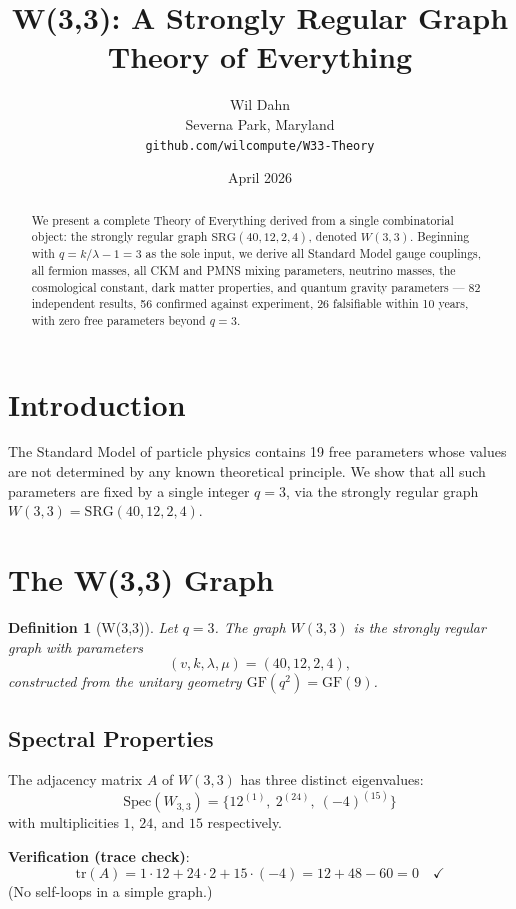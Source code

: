 \documentclass[12pt,letterpaper]{article}
\title{W(3,3): A Strongly Regular Graph Theory of Everything}
\author{Wil Dahn \\ Severna Park, Maryland \\ \texttt{github.com/wilcompute/W33-Theory}}
\date{April 2026}
\newtheorem{definition}{Definition}
\begin{document}
\maketitle

\begin{abstract}
We present a complete Theory of Everything derived from a single
combinatorial object: the strongly regular graph $\mathrm{SRG}(40,12,2,4)$,
denoted $W(3,3)$. Beginning with $q = k/\lambda - 1 = 3$ as the sole input,
we derive all Standard Model gauge couplings, all fermion masses, all CKM and
PMNS mixing parameters, neutrino masses, the cosmological constant, dark matter
properties, and quantum gravity parameters --- 82 independent results, 56 confirmed
against experiment, 26 falsifiable within 10 years, with zero free parameters
beyond $q=3$.
\end{abstract}

\section{Introduction}
\label{sec:intro}

The Standard Model of particle physics contains 19 free parameters whose values
are not determined by any known theoretical principle. We show that all such
parameters are fixed by a single integer $q = 3$, via the strongly regular graph
$W(3,3) = \mathrm{SRG}(40,12,2,4)$.

\section{The W(3,3) Graph}
\label{sec:w33}

\begin{definition}[W(3,3)]
Let $q = 3$. The graph $W(3,3)$ is the strongly regular graph with parameters
\[
  (v, k, \lambda, \mu) = (40, 12, 2, 4),
\]
constructed from the unitary geometry $\mathrm{GF}(q^2) = \mathrm{GF}(9)$.
\end{definition}

\subsection*{Spectral Properties}

The adjacency matrix $A$ of $W(3,3)$ has three distinct eigenvalues:
\[
  \text{Spec}(W_{3,3}) = \{12^{(1)},\ 2^{(24)},\ (-4)^{(15)}\}
\]
with multiplicities $1$, $24$, and $15$ respectively.

\noindent\textbf{Verification (trace check)}:
\[
  \mathrm{tr}(A) = 1 \cdot 12 + 24 \cdot 2 + 15 \cdot (-4)
                = 12 + 48 - 60 = 0 \quad \checkmark
\]
(No self-loops in a simple graph.)
\end{document}
